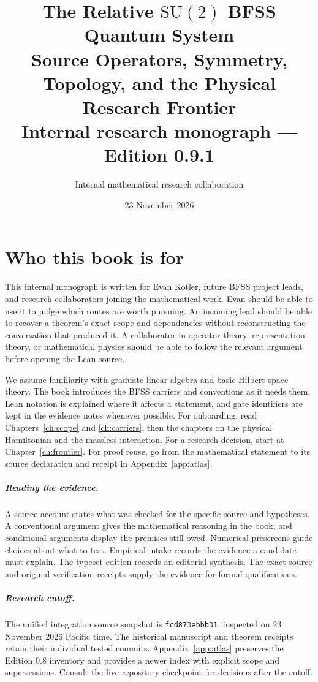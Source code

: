 \documentclass[11pt,oneside]{book}
\title{\textbf{The Relative $\mathrm{SU}(2)$ BFSS Quantum System}\\[0.4em]
  \Large Source Operators, Symmetry, Topology, and the Physical Research Frontier\\[0.6em]
  \large Internal research monograph --- Edition 0.9.1}
\author{Internal mathematical research collaboration}
\date{23 November 2026}
\theoremstyle{definition}
\theoremstyle{remark}
\begin{document}
\hypersetup{pageanchor=false}
\frontmatter
\maketitle
\hypersetup{pageanchor=true}
\chapter*{Who this book is for}
This internal monograph is written for Evan Kotler, future BFSS project
leads, and research collaborators joining the mathematical work. Evan
should be able to use it to judge which routes are worth pursuing. An
incoming lead should be able to recover a theorem's exact scope and
dependencies without reconstructing the conversation that produced it.
A collaborator in operator theory, representation theory, or
mathematical physics should be able to follow the relevant argument
before opening the Lean source.

We assume familiarity with graduate linear algebra and basic Hilbert
space theory. The book introduces the BFSS carriers and conventions
as it needs them. Lean notation is explained where it affects a
statement, and gate identifiers are kept in the evidence notes whenever
possible. For onboarding, read Chapters~\ref{ch:scope} and
\ref{ch:carriers}, then the chapters on the physical Hamiltonian and
the massless interaction. For a research decision, start at
Chapter~\ref{ch:frontier}. For proof reuse, go from the mathematical
statement to its source declaration and receipt in
Appendix~\ref{app:atlas}.

\paragraph{Reading the evidence.}
A source account states what was checked for the specific source and
hypotheses. A conventional argument gives the mathematical reasoning
in the book, and conditional arguments display the premises still
owed. Numerical prescreens guide choices about what to test. Empirical
intake records the evidence a candidate must explain. The typeset
edition records an editorial synthesis. The exact source and original
verification receipts supply the evidence for formal qualifications.

\paragraph{Research cutoff.}
The unified integration source snapshot is
\texttt{fcd873ebbb31}, inspected on 23 November 2026 Pacific time.
The historical manuscript and theorem receipts retain their individual
tested commits. Appendix~\ref{app:atlas} preserves the Edition 0.8
inventory and provides a newer index with explicit scope and
supersessions. Consult the live repository checkpoint for decisions
after the cutoff.
\end{document}
